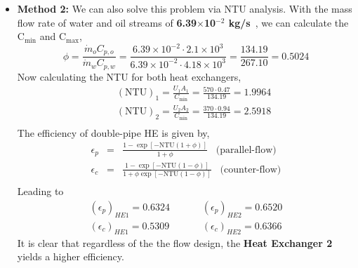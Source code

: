 \documentclass[calculator,steamtables,datasheet,solutions]{exam_newMarcus2}
\newcommand{\frc}{\displaystyle\frac}
\begin{document}
\begin{question}
\begin{enumerate}
{\begin{itemize}
\item {\bf Method 2:} We can also solve this problem via NTU analysis. With the mass flow rate of water and oil streams of {\bf 6.39$\times$10$^{-2}$ kg/s}~, we can calculate the C$_{\text{min}}$ and C$_{\text{max}}$,~
\begin{displaymath}
\phi = \frac{\dot{m}_{o}C_{p,o}}{\dot{m}_{w}C_{p,w}}= \frc{6.39\times 10^{-2} \cdot 2.1\times 10^{3}}{6.39\times 10^{-2} \cdot 4.18\times 10^{3}} = \frac{134.19}{267.10} = 0.5024
\end{displaymath} 
Now calculating  the NTU for both heat exchangers,~
\begin{eqnarray}
&& \left(\text{NTU}\right)_{1} = \frac{U_{1}A_{1}}{C_{\text{min}}} = \frac{570\cdot 0.47}{134.19} = 1.9964 \nonumber \\
&& \left(\text{NTU}\right)_{2} = \frac{U_{2}A_{2}}{C_{\text{min}}} = \frac{370\cdot 0.94}{134.19} = 2.5918 \nonumber \\
\end{eqnarray}
The efficiency of double-pipe HE is given by,
\begin{eqnarray}
\epsilon_{p} &=& \frac{1-\exp\left[-\text{NTU}\left(1+\phi\right)\right]}{1+\phi}\;\;\;\text{(parallel-flow)} \nonumber \\
\epsilon_{c} &=& \frac{1-\exp\left[-\text{NTU}\left(1-\phi\right)\right]}{1+\phi\exp\left[-\text{NTU}\left(1-\phi\right)\right]}\;\;\;\text{(counter-flow)} \nonumber \\
\end{eqnarray}
Leading to~
\begin{eqnarray}
\left(\epsilon_{p}\right)_{HE1} = 0.6324 \;\;&\;\;&\;\; \left(\epsilon_{p}\right)_{HE2} = 0.6520 \nonumber \\
\left(\epsilon_{c}\right)_{HE1} = 0.5309 \;\;&\;\;&\;\; \left(\epsilon_{c}\right)_{HE2} = 0.6366 \nonumber
\end{eqnarray}
It is clear that regardless of the the flow design, the {\bf Heat Exchanger 2}~ yields a higher efficiency.
\end{itemize}}
%


\end{enumerate}
\end{question}
\end{document}
